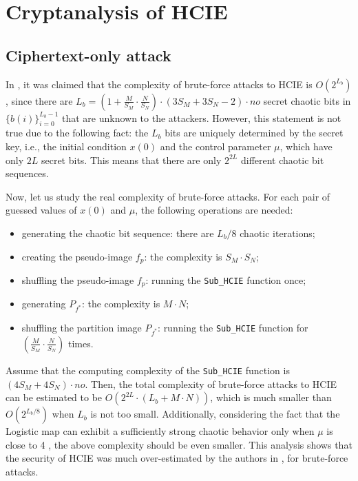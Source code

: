 \documentclass[final,3p,times,twocolumn]{elsarticle}
\begin{document}
\section{Cryptanalysis of HCIE}
\label{sec:cryptanalysisHCIE2}

\subsection{Ciphertext-only attack}

In \cite{Yen-Guo:HCIE:IEEPVISP2000}, it was claimed that the complexity of
brute-force attacks to HCIE is $O\left(2^{L_b}\right)$, since
there are
$L_b=\left(1+\frac{M}{S_M}\cdot\frac{N}{S_N}\right)\cdot(3S_M+3S_N-2)\cdot
no$ secret chaotic bits in $\{b(i)\}_{i=0}^{L_b-1}$ that are
unknown to the attackers. However, this statement is not true due to
the following fact: the $L_b$ bits are uniquely determined by the
secret key, i.e., the initial condition $x(0)$ and the control
parameter $\mu$, which have only $2L$ secret bits. This means that
there are only $2^{2L}$ different chaotic bit sequences.

Now, let
us study the real complexity of brute-force attacks. For each pair
of guessed values of $x(0)$ and $\mu$, the following operations
are needed:
\begin{itemize}
\item generating the chaotic bit sequence: there are $L_b/8$ chaotic
iterations;

\item creating the pseudo-image $f_p$: the complexity is $S_M\cdot
S_N$;

\item shuffling the pseudo-image $f_p$: running the
\texttt{Sub\_HCIE} function once;

\item generating $P_{f^*}$: the complexity is $M\cdot N$;

\item shuffling the partition image $P_{f^*}$: running the
\texttt{Sub\_HCIE} function for
$\left(\frac{M}{S_M}\cdot\frac{N}{S_N}\right)$ times.
\end{itemize}
Assume that the computing complexity of the \texttt{Sub\_HCIE}
function is $(4S_M+4S_N)\cdot no$. Then, the total complexity of
brute-force attacks to HCIE can be estimated to be
$O\left(2^{2L}\cdot(L_b+M\cdot N)\right)$, which is much smaller than
$O\left(2^{L_b/8}\right)$ when $L_b$ is not too small.
Additionally, considering the fact that the Logistic map can
exhibit a sufficiently strong chaotic behavior only when $\mu$ is
close to 4 \cite{Li:logistic:ND2014}, the above complexity should
be even smaller. This analysis shows that the security of
HCIE was much over-estimated by the authors in
\cite{Yen-Guo:HCIE:ISC99,Yen-Guo:HCIE:IEEPVISP2000}, for brute-force attacks.
\end{document}
